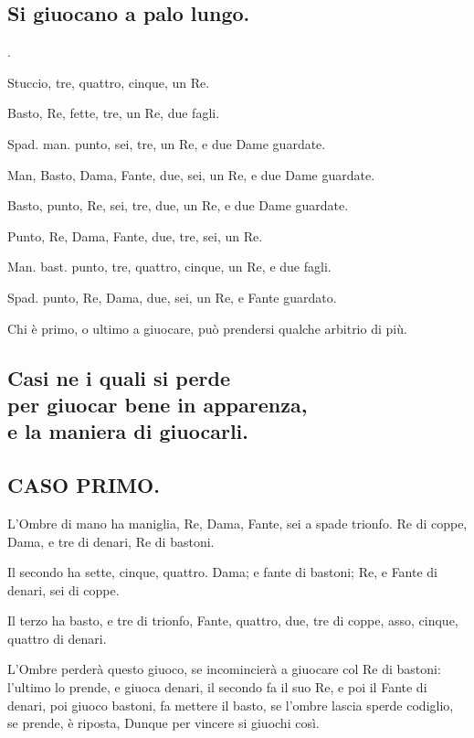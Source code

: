 \documentclass[11pt,a6paper]{article}
\newcounter{listombrecnt}
\newenvironment{listombre}{
  \begin{list}
    {\arabic{listombrecnt}.}
    {\usecounter{listombrecnt}
      \setlength{\labelwidth}{0.3pt}
      \setlength{\labelsep}{0.3em}
      \setlength{\itemsep}{-0.2em}
      \setlength{\leftmargin}{0em}
      \setlength{\itemindent}{0.6em} %
    }
}{\end{list}}
\begin{document}
\subsection{Si giuocano a palo lungo.}
\begin{listombre}
\item Stuccio, tre, quattro, cinque, un Re.
\item Basto, Re, fette, tre, un Re, due fagli.
\item Spad. man. punto, sei, tre, un Re, e due
Dame guardate.
\item Man, Basto, Dama, Fante, due, sei, un
Re, e due Dame guardate.
\item Basto, punto, Re, sei, tre, due, un Re, e
due Dame guardate.
\item Punto, Re, Dama, Fante, due, tre,
sei, un Re.
\item Man. bast. punto, tre, quattro, cinque,
un Re, e due fagli.
\item Spad.
punto, Re, Dama, due, sei, un
Re, e Fante guardato.
\end{listombre}

 Chi è primo, o ultimo a giuocare, può
prendersi qualche arbitrio di più.

\subsection{
Casi ne i quali si perde \\per giuocar bene
in apparenza, \\e la maniera di giuocarli.}

\subsection{CASO PRIMO.}

L'Ombre di mano ha maniglia, Re, Dama,
Fante, sei a spade trionfo. Re di coppe,
Dama, e tre di denari, Re di bastoni.

Il secondo ha sette, cinque, quattro. Dama; e
fante di bastoni; Re, e Fante di denari, sei di coppe.

Il terzo ha basto, e tre di trionfo, Fante,
quattro, due, tre di coppe, asso, cinque,
quattro di denari.

L'Ombre perderà questo giuoco, se incomincierà
a giuocare col Re di bastoni: l'ultimo
lo prende, e giuoca denari, il secondo
fa il suo Re, e poi il Fante di denari, poi
giuoco bastoni, fa mettere il basto, se l'ombre
lascia sperde codiglio, se prende, è riposta,
Dunque per vincere si giuochi così.
\end{document}
